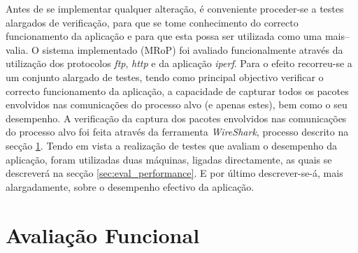 








Antes de se implementar qualquer alteração, é conveniente proceder-se a testes alargados de verificação, para que se tome conhecimento do correcto funcionamento da aplicação e para que esta possa ser utilizada como uma mais–valia. 
O sistema implementado (MRoP) foi avaliado funcionalmente através da utilização dos protocolos \textit{ftp}, \textit{http} e da aplicação \textit{iperf}\cite{iperf}.
Para o efeito recorreu-se a um conjunto alargado de testes, tendo como principal objectivo verificar o correcto funcionamento da aplicação, a capacidade de capturar todos os pacotes envolvidos nas comunicações do processo alvo (e apenas estes), bem como o seu desempenho.
A verificação da captura dos pacotes envolvidos nas comunicações do processo alvo foi feita através da ferramenta \textit{WireShark}, processo descrito na secção \ref{sec:eval_functional}.
Tendo em vista a realização de testes que avaliam o desempenho da aplicação, foram utilizadas duas máquinas, ligadas directamente, as quais se descreverá na secção \ref{sec:eval_performance}.
E por último descrever-se-á, mais alargadamente, sobre o desempenho efectivo da aplicação.


\section{Avaliação Funcional}
\label{sec:eval_functional}


